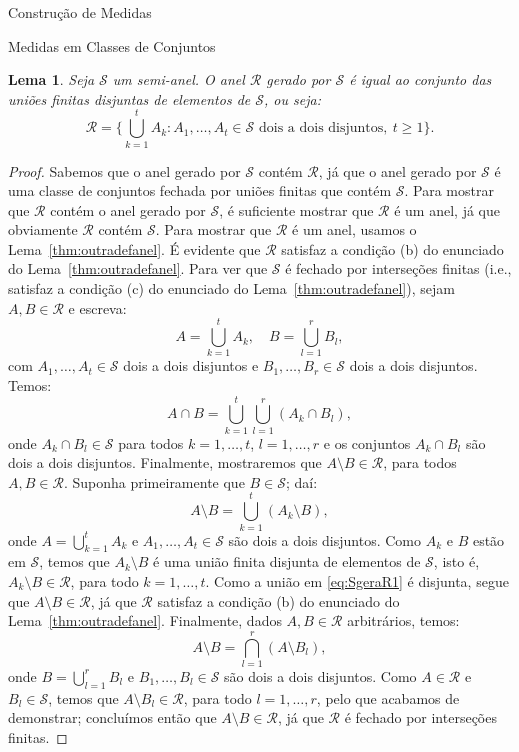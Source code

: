 \documentclass[oneside,final,11pt]{amsbook}
\theoremstyle{remark}\newtheorem{exercise}{Exercício}[chapter]
\theoremstyle{remark}\newtheorem{*exercise}[exercise]{\hbox to 0pt{\hskip 0pt minus 1fil*}Exercício}
\theoremstyle{definition}\newtheorem{exdefin}{Definição}[chapter]
\theoremstyle{plain}\newtheorem{teo}{Teorema}[section]
\theoremstyle{plain}\newtheorem{lem}[teo]{Lema}
\theoremstyle{plain}\newtheorem{prop}[teo]{Proposição}
\theoremstyle{plain}\newtheorem{cor}[teo]{Corolário}
\theoremstyle{definition}\newtheorem{defin}[teo]{Definição}
\theoremstyle{remark}\newtheorem{rem}[teo]{Observação}
\theoremstyle{definition}\newtheorem{notation}[teo]{Notação}
\theoremstyle{definition}\newtheorem{convention}[teo]{Convenção}
\theoremstyle{definition}\newtheorem{example}[teo]{Exemplo}
\numberwithin{section}{chapter}
\numberwithin{equation}{section}
\begin{document}
\begin{chapter}{Construção de Medidas}
\begin{section}{Medidas em Classes de Conjuntos}
\begin{lem}\label{thm:semigeraanel}
Seja $\mathcal S$ um semi-anel. O anel $\mathcal R$ gerado por $\mathcal S$ é igual ao conjunto das uniões
finitas disjuntas de elementos de $\mathcal S$, ou seja:
\[\mathcal R=\Big\{\bigcup_{k=1}^tA_k:\text{$A_1,\ldots,A_t\in\mathcal S$ dois a dois disjuntos},\ t\ge1\big\}.\]
\end{lem}
\begin{proof}
Sabemos que o anel gerado por $\mathcal S$ contém $\mathcal R$, já que o anel gerado por $\mathcal S$
é uma classe de conjuntos fechada por uniões finitas que contém $\mathcal S$. Para mostrar que $\mathcal R$ contém o anel
gerado por $\mathcal S$, é suficiente mostrar que $\mathcal R$ é um anel, já que obviamente $\mathcal R$ contém $\mathcal S$.
Para mostrar que $\mathcal R$ é um anel, usamos o Lema~\ref{thm:outradefanel}. É evidente que $\mathcal R$ satisfaz
a condição (b) do enunciado do Lema~\ref{thm:outradefanel}. Para ver que $\mathcal S$ é fechado por interseções finitas
(i.e., satisfaz a condição (c) do enunciado do Lema~\ref{thm:outradefanel}), sejam $A,B\in\mathcal R$ e escreva:
\[A=\bigcup_{k=1}^tA_k,\quad B=\bigcup_{l=1}^rB_l,\]
com $A_1,\ldots,A_t\in\mathcal S$ dois a dois disjuntos e $B_1,\ldots,B_r\in\mathcal S$ dois a dois disjuntos. Temos:
\[A\cap B=\bigcup_{k=1}^t\bigcup_{l=1}^r(A_k\cap B_l),\]
onde $A_k\cap B_l\in\mathcal S$ para todos $k=1,\ldots,t$, $l=1,\ldots,r$ e os conjuntos $A_k\cap B_l$ são dois a dois
disjuntos. Finalmente, mostraremos que $A\setminus B\in\mathcal R$, para todos $A,B\in\mathcal R$. Suponha primeiramente
que $B\in\mathcal S$; daí:
\begin{equation}\label{eq:SgeraR1}
A\setminus B=\bigcup_{k=1}^t(A_k\setminus B),
\end{equation}
onde $A=\bigcup_{k=1}^tA_k$ e $A_1,\ldots,A_t\in\mathcal S$ são dois a dois disjuntos. Como $A_k$ e $B$ estão em
$\mathcal S$, temos que $A_k\setminus B$ é uma união finita disjunta de elementos de $\mathcal S$, isto é,
$A_k\setminus B\in\mathcal R$, para todo $k=1,\ldots,t$. Como a união em \eqref{eq:SgeraR1} é disjunta, segue
que $A\setminus B\in\mathcal R$, já que $\mathcal R$ satisfaz a condição (b) do enunciado do Lema~\ref{thm:outradefanel}.
Finalmente, dados $A,B\in\mathcal R$ arbitrários, temos:
\[A\setminus B=\bigcap_{l=1}^r(A\setminus B_l),\]
onde $B=\bigcup_{l=1}^rB_l$ e $B_1,\ldots,B_l\in\mathcal S$ são dois a dois disjuntos. Como $A\in\mathcal R$ e
$B_l\in\mathcal S$, temos que $A\setminus B_l\in\mathcal R$, para todo $l=1,\ldots,r$, pelo que
acabamos de demonstrar; concluímos então que $A\setminus B\in\mathcal R$, já que $\mathcal R$ é fechado por
interseções finitas.
\end{proof}


\end{section}
\end{chapter}
\end{document}
